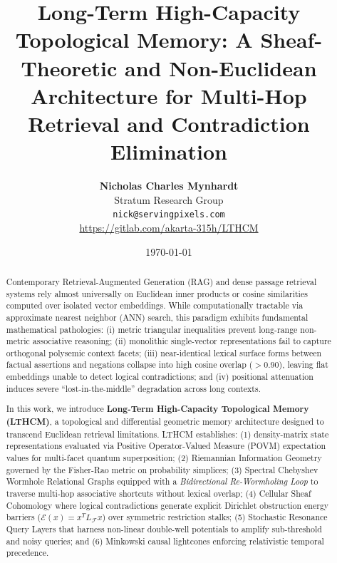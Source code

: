 \documentclass[11pt,a4paper]{article}
\title{\textbf{Long-Term High-Capacity Topological Memory: A Sheaf-Theoretic and Non-Euclidean Architecture for Multi-Hop Retrieval and Contradiction Elimination}}
\author{
  \textbf{Nicholas Charles Mynhardt} \\
  Stratum Research Group \\
  \texttt{nick@servingpixels.com} \\[1ex]
  \small\url{https://gitlab.com/akarta-315h/LTHCM}
}
\date{\today}
\begin{document}
\maketitle

\begin{abstract}
Contemporary Retrieval-Augmented Generation (RAG) and dense passage retrieval systems rely almost universally on Euclidean inner products or cosine similarities computed over isolated vector embeddings. While computationally tractable via approximate nearest neighbor (ANN) search, this paradigm exhibits fundamental mathematical pathologies: (i) metric triangular inequalities prevent long-range non-metric associative reasoning; (ii) monolithic single-vector representations fail to capture orthogonal polysemic context facets; (iii) near-identical lexical surface forms between factual assertions and negations collapse into high cosine overlap ($>0.90$), leaving flat embeddings unable to detect logical contradictions; and (iv) positional attenuation induces severe ``lost-in-the-middle'' degradation across long contexts. 

In this work, we introduce \textbf{Long-Term High-Capacity Topological Memory (LTHCM)}, a topological and differential geometric memory architecture designed to transcend Euclidean retrieval limitations. LTHCM establishes: (1) density-matrix state representations evaluated via Positive Operator-Valued Measure (POVM) expectation values for multi-facet quantum superposition; (2) Riemannian Information Geometry governed by the Fisher-Rao metric on probability simplices; (3) Spectral Chebyshev Wormhole Relational Graphs equipped with a \emph{Bidirectional Re-Wormholing Loop} to traverse multi-hop associative shortcuts without lexical overlap; (4) Cellular Sheaf Cohomology where logical contradictions generate explicit Dirichlet obstruction energy barriers ($\mathcal{E}(x) = x^T L_{\mathcal{F}} x$) over symmetric restriction stalks; (5) Stochastic Resonance Query Layers that harness non-linear double-well potentials to amplify sub-threshold and noisy queries; and (6) Minkowski causal lightcones enforcing relativistic temporal precedence. 


\end{abstract}
\end{document}
